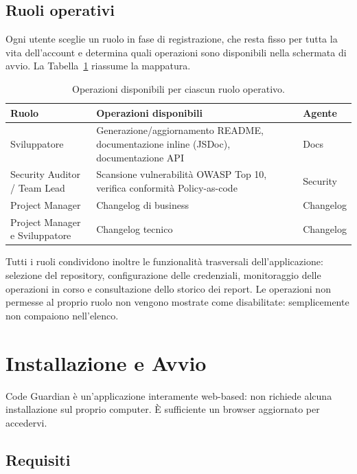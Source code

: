 \documentclass[11pt,a4paper]{article}
\begin{document}
\subsection{Ruoli operativi}

Ogni utente sceglie un ruolo in fase di registrazione, che resta fisso per tutta la vita
dell'account e determina quali operazioni sono disponibili nella schermata di avvio. La
Tabella~\ref{tab:ruoli} riassume la mappatura.

\begin{table}[h]
\centering
\renewcommand{\arraystretch}{1.3}
\begin{tabularx}{\textwidth}{|>{\raggedright\arraybackslash}p{3.1cm}|X|>{\centering\arraybackslash}p{2.0cm}|}
\hline
\textbf{Ruolo} & \textbf{Operazioni disponibili} & \textbf{Agente} \\
\hline
Sviluppatore & Generazione/aggiornamento README, documentazione inline (JSDoc), documentazione API & Docs \\
\hline
Security Auditor / Team Lead & Scansione vulnerabilità OWASP Top 10, verifica conformità Policy-as-code & Security \\
\hline
Project Manager & Changelog di business & Changelog \\
\hline
Project Manager e Sviluppatore & Changelog tecnico & Changelog \\
\hline
\end{tabularx}
\caption{Operazioni disponibili per ciascun ruolo operativo.}
\label{tab:ruoli}
\end{table}

Tutti i ruoli condividono inoltre le funzionalità trasversali dell'applicazione: selezione
del repository, configurazione delle credenziali, monitoraggio delle operazioni in corso e
consultazione dello storico dei report. Le operazioni non permesse al proprio ruolo non
vengono mostrate come disabilitate: semplicemente non compaiono nell'elenco.

\newpage
\section{Installazione e Avvio}

Code Guardian è un'applicazione interamente web-based: non richiede alcuna installazione
sul proprio computer. È sufficiente un browser aggiornato per accedervi.

\subsection{Requisiti}
\end{document}
